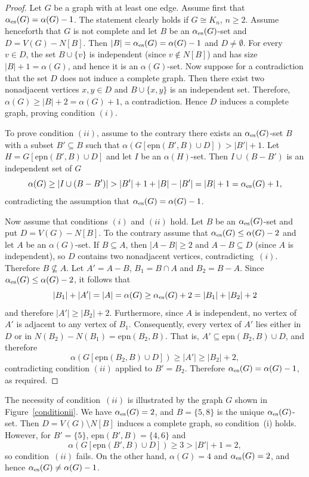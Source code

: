 \documentclass[11pt]{article}
\newcommand{\es}{\alpha_{\rm es}}
\newcommand{\al}{\alpha}
\newcommand{\EPN}{\mathrm{epn}}
\begin{document}
\begin{proof}
Let $G$ be a graph  with at least one edge. 
Assume first that $\es(G)=\alpha(G)-1$. The statement clearly holds if $G\cong K_n$, $n\geq 2$. Assume henceforth that $G$ is not complete and let $B$ be an $\es(G)$-set and $D=V(G)-N[B]$. Then $|B|=\es(G)=\alpha(G)-1$ and $D\neq\emptyset$. For every $v\in D$,
the set $B\cup\{v\}$ is independent (since $v\notin N[B]$) and has size $|B|+1=\al(G)$, and hence
it is an $\al(G)$-set. Now suppose for a contradiction that the set $D$ does not induce a complete graph. Then there exist two nonadjacent vertices $x,y\in D$ and $B\cup\{x,y\}$ is an independent set. Therefore, $\alpha(G) \ge |B|+2 =\alpha(G)+1$, a contradiction. Hence $D$ induces a complete graph, proving condition $(i)$.

To prove condition $(ii)$, assume to the contrary there exists an $\es(G)$-set $B$ with a subset $B'\subseteq B$ such that $\alpha(G[\EPN(B',B)\cup D]) > |B'|+1$. Let $H=G[\EPN(B',B)\cup D]$ and let $I$ be an $\alpha(H)$-set. Then $I\cup (B-B')$ is an independent set of $G$
\[\alpha(G)\geq |I\cup (B-B')|>|B'|+1+|B|-|B'|=|B|+1=\es(G)+1,\]
contradicting the assumption that $\es(G)=\alpha(G)-1$.

Now assume that conditions $(i)$ and $(ii)$ hold. 
Let $B$ be an $\es(G)$-set and put
$D=V(G)-N[B]$. To the contrary assume that $\es(G)\leq \alpha(G) -2$ and let $A$ be an $\alpha(G)$-set.
If $B\subseteq A$, then $|A-B|\ge 2$ and $A-B\subseteq D$ (since $A$ is
independent), so $D$ contains two nonadjacent vertices, contradicting~$(i)$. 
Therefore $B\not\subseteq A$. Let $A'=A-B$, $B_1=B\cap A$ and $B_2=B-A$. Since $\es(G)\leq \alpha(G) -2$, it follows that 
\[|B_1|+|A'|=|A|=\alpha(G)\geq \es(G)+2=|B_1|+|B_2|+2\]
and therefore $|A'|\geq |B_2|+2$. 
Furthermore, since $A$ is independent, no vertex of $A'$ is adjacent to any vertex of $B_1$.
Consequently, every vertex of $A'$ lies either in $D$ or in $N(B_2)-N(B_1)
=\EPN(B_2,B)$. That is, 
$A'\subseteq \EPN(B_2,B)\cup D$, 
and therefore $$
\al\left(G[\EPN(B_2,B)\cup D]\right)\ge |A'|\ge |B_2|+2,$$
contradicting condition $(ii)$ applied to $B'=B_2$. Therefore $\es(G)=\al(G)-1$, as required.
\end{proof}

The necessity of condition~$(ii)$ is illustrated by the graph $G$ shown in Figure~\ref{conditionii}. We have $\es(G)=2$, and $B=\{5,8\}$ is the unique $\es(G)$-set. Then $D=V(G)\setminus N[B]$ induces a complete graph, so condition~(i) holds. However, for $B'=\{5\}$, $\EPN(B',B)=\{4,6\}$ and
$$\alpha(G[\EPN(B',B)\cup D]) \ge 3 > |B'|+1=2,$$
so condition~$(ii)$ fails. On the other hand, $\alpha(G)=4$ and $\es(G)=2$, and hence $\es(G)\ne \alpha(G)-1$.
\end{document}
